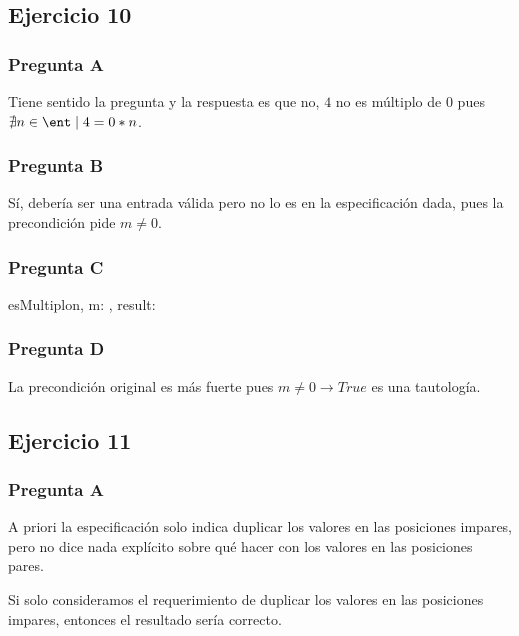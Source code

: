 \subsection{Ejercicio 10}

\subsubsection{Pregunta A}

Tiene sentido la pregunta y la respuesta es que no, $4$ no es múltiplo de $0$ pues $\nexists n \in \ent \mid 4 = 0 * n$.

\subsubsection{Pregunta B}

Sí, debería ser una entrada válida pero no lo es en la especificación dada, pues la precondición pide $m \neq 0$.

\subsubsection{Pregunta C}

\begin{proc}{esMultiplo}{\In n, m: \ent, \Out result: \bool}{}
\end{proc}

\subsubsection{Pregunta D}

La precondición original es más fuerte pues $m \neq 0 \rightarrow True$ es una tautología.

\subsection{Ejercicio 11}

\subsubsection{Pregunta A}

A priori la especificación solo indica duplicar los valores en las posiciones impares, pero no dice nada explícito sobre qué hacer con los valores en las posiciones pares.

Si solo consideramos el requerimiento de duplicar los valores en las posiciones impares, entonces el resultado sería correcto.

